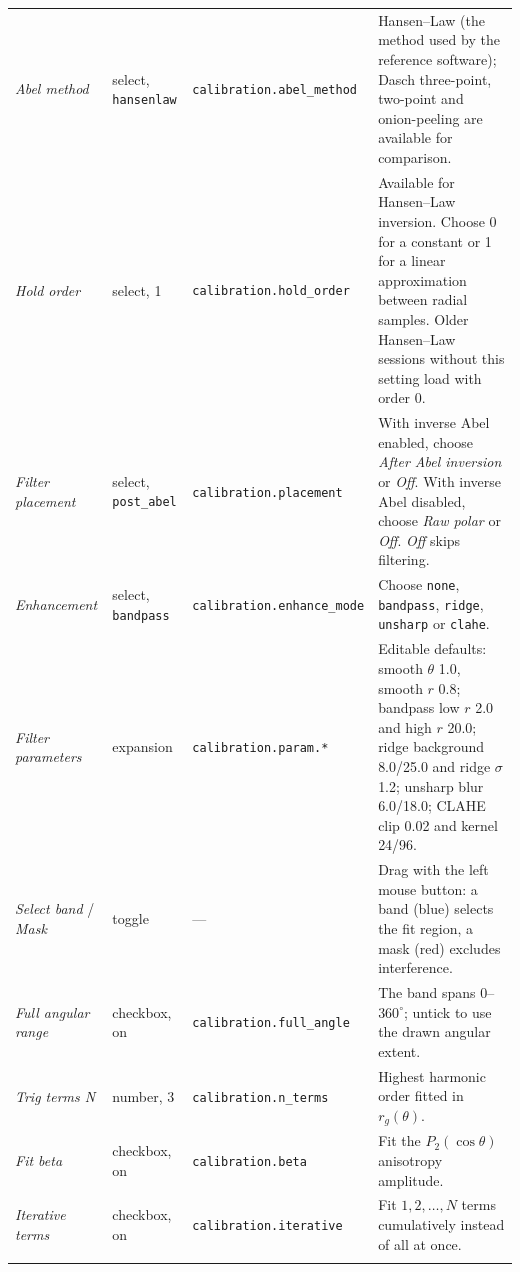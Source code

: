 \documentclass[11pt,a4paper]{article}
\newcommand{\code}[1]{\texttt{#1}}
\begin{document}
\begin{center}
\begin{longtable}{@{}L{3.6cm}L{3.1cm}L{2.9cm}L{6.3cm}@{}}
\addlinespace
\emph{Abel method} & select, \code{hansenlaw} & \code{calibration.\allowbreak{}abel\_\allowbreak{}method} &
Hansen--Law (the method used by the reference software); Dasch three-point,
two-point and onion-peeling are available for comparison. \\
\addlinespace
\emph{Hold order} & select, 1 & \code{calibration.\allowbreak{}hold\_\allowbreak{}order} &
Available for Hansen--Law inversion. Choose 0 for a constant or 1 for a
linear approximation between radial samples. Older Hansen--Law sessions
without this setting load with order 0. \\
\addlinespace
\emph{Filter placement} & select, \code{post\_\allowbreak{}abel} & \code{calibration.\allowbreak{}placement} &
With inverse Abel enabled, choose \emph{After Abel inversion} or \emph{Off}.
With inverse Abel disabled, choose \emph{Raw polar} or \emph{Off}.
\emph{Off} skips filtering. \\
\addlinespace
\emph{Enhancement} & select, \code{bandpass} & \code{calibration.\allowbreak{}enhance\_\allowbreak{}mode} &
Choose \code{none}, \code{bandpass}, \code{ridge}, \code{unsharp} or \code{clahe}. \\
\addlinespace
\emph{Filter parameters} & expansion & \code{calibration.\allowbreak{}param.\allowbreak{}*} &
Editable defaults: smooth $\theta$ 1.0, smooth $r$ 0.8; bandpass low $r$ 2.0
and high $r$ 20.0; ridge background 8.0/25.0 and ridge $\sigma$ 1.2; unsharp
blur 6.0/18.0; CLAHE clip 0.02 and kernel 24/96. \\
\addlinespace
\emph{Select band} / \emph{Mask} & toggle & --- & Drag with the left mouse button:
a band (blue) selects the fit region, a mask (red) excludes interference. \\
\addlinespace
\emph{Full angular range} & checkbox, on & \code{calibration.\allowbreak{}full\_\allowbreak{}angle} &
The band spans $0$--$360^\circ$; untick to use the drawn angular extent. \\
\addlinespace
\emph{Trig terms N} & number, 3 & \code{calibration.\allowbreak{}n\_\allowbreak{}terms} &
Highest harmonic order fitted in $r_g(\theta)$. \\
\addlinespace
\emph{Fit beta} & checkbox, on & \code{calibration.\allowbreak{}beta} &
Fit the $P_2(\cos\theta)$ anisotropy amplitude. \\
\addlinespace
\emph{Iterative terms} & checkbox, on & \code{calibration.\allowbreak{}iterative} &
Fit $1,2,\ldots,N$ terms cumulatively instead of all at once. \\
\addlinespace

\end{longtable}
\end{center}
\end{document}

